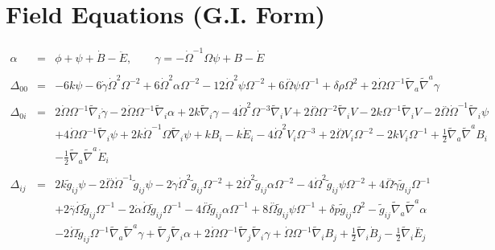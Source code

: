 \documentclass[10pt,letterpaper]{article}
\numberwithin{equation}{section}
\begin{document}
\section{Field Equations (G.I. Form)}
\begin{eqnarray}
\alpha  &=& \phi + \psi + \dot B - \ddot E,\qquad \gamma = - \dot\Omega^{-1}\Omega \psi + B - \dot E
\\ \nonumber\\
\Delta_{00}&=& -6 k \psi - 6 \dot{\gamma} \dot{\Omega}^2 \Omega^{-2} + 6 \dot{\Omega}^2 \alpha \Omega^{-2} - 12 \dot{\Omega}^2 \psi \Omega^{-2} + 6 \overset{..}{\Omega} \psi \Omega^{-1} + \delta \rho \Omega^2 + 2 \dot{\Omega} \Omega^{-1} \tilde{\nabla}_{a}\tilde{\nabla}^{a}\gamma 
\\  \nonumber\\ 
\Delta_{0i}&=& 2 \dot{\Omega} \Omega^{-1} \tilde{\nabla}_{i}\dot{\gamma} - 2 \dot{\Omega} \Omega^{-1} \tilde{\nabla}_{i}\alpha + 2 k \tilde{\nabla}_{i}\gamma - 4 \dot{\Omega}^2 \Omega^{-3} \tilde{\nabla}_{i}V + 2 \overset{..}{\Omega} \Omega^{-2} \tilde{\nabla}_{i}V - 2 k \Omega^{-1} \tilde{\nabla}_{i}V - 2 \overset{..}{\Omega} \dot{\Omega}^{-1} \tilde{\nabla}_{i}\psi \nonumber \\ 
&& + 4 \dot{\Omega} \Omega^{-1} \tilde{\nabla}_{i}\psi + 2 k \dot{\Omega}^{-1} \Omega \tilde{\nabla}_{i}\psi +k B_{i} -  k \dot{E}_{i} - 4 \dot{\Omega}^2 V_{i} \Omega^{-3} + 2 \overset{..}{\Omega} V_{i} \Omega^{-2} - 2 k V_{i} \Omega^{-1} + \tfrac{1}{2} \tilde{\nabla}_{a}\tilde{\nabla}^{a}B_{i} \nonumber \\ 
&& -  \tfrac{1}{2} \tilde{\nabla}_{a}\tilde{\nabla}^{a}\dot{E}_{i}
\\  \nonumber\\ 
\Delta_{ij}&=& 2 k \tilde{g}_{ij} \psi - 2 \overset{...}{\Omega} \dot{\Omega}^{-1} \tilde{g}_{ij} \psi - 2 \dot{\gamma} \dot{\Omega}^2 \tilde{g}_{ij} \Omega^{-2} + 2 \dot{\Omega}^2 \tilde{g}_{ij} \alpha \Omega^{-2} - 4 \dot{\Omega}^2 \tilde{g}_{ij} \psi \Omega^{-2} + 4 \overset{..}{\Omega} \dot{\gamma} \tilde{g}_{ij} \Omega^{-1} \nonumber \\ 
&& + 2 \overset{..}{\gamma} \dot{\Omega} \tilde{g}_{ij} \Omega^{-1} - 2 \dot{\alpha} \dot{\Omega} \tilde{g}_{ij} \Omega^{-1} - 4 \overset{..}{\Omega} \tilde{g}_{ij} \alpha \Omega^{-1} + 8 \overset{..}{\Omega} \tilde{g}_{ij} \psi \Omega^{-1} + \delta p \tilde{g}_{ij} \Omega^2 -  \tilde{g}_{ij} \tilde{\nabla}_{a}\tilde{\nabla}^{a}\alpha \nonumber \\ 
&& - 2 \dot{\Omega} \tilde{g}_{ij} \Omega^{-1} \tilde{\nabla}_{a}\tilde{\nabla}^{a}\gamma + \tilde{\nabla}_{j}\tilde{\nabla}_{i}\alpha + 2 \dot{\Omega} \Omega^{-1} \tilde{\nabla}_{j}\tilde{\nabla}_{i}\gamma +\dot{\Omega} \Omega^{-1} \tilde{\nabla}_{i}B_{j} + \tfrac{1}{2} \tilde{\nabla}_{i}\dot{B}_{j} -  \tfrac{1}{2} \tilde{\nabla}_{i}\overset{..}{E}_{j} \nonumber \\ 

\end{eqnarray}
\end{document}
